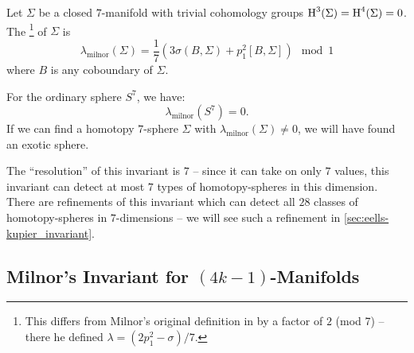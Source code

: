 \begin{definition}
	Let $\Sigma$ be a closed $7$-manifold with trivial cohomology groups $\operatorname{H}^3(\Sigma)=\operatorname{H}^4(\Sigma)=0$. The \footnote{This differs from Milnor's original definition in \cite{milnor1956manifolds} by a factor of $2$ (mod 7) -- there he defined $\lambda=(2p_1^2-\sigma)/7$.} of $\Sigma$ is
	\[
		\boxed{\lambda_{\mathrm{milnor}}(\Sigma) = \frac{1}{7}\left(3\sigma(B,\Sigma)+p_1^2[B,\Sigma]\right)\mod 1}
	\]
	where $B$ is any coboundary of $\Sigma$.
\end{definition}
For the ordinary sphere $S^7$, we have:
\[
	\lambda_{\textrm{milnor}}(S^7)=0.
\]
If we can find a homotopy $7$-sphere $\Sigma$ with $\lambda_{\textrm{milnor}}(\Sigma)\neq 0$, we will have found an exotic sphere. 

\begin{remark} The ``resolution'' of this invariant is $7$ -- since it can take on only $7$ values, this invariant can detect at most $7$ types of homotopy-spheres in this dimension. There are refinements of this invariant which can detect all $28$ classes of homotopy-spheres in $7$-dimensions -- we will see such a refinement in \cref{sec:eells-kupier_invariant}.\end{remark}

\subsection*{Milnor's Invariant for $(4k-1)$-Manifolds}

